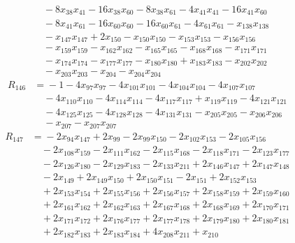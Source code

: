 \begin{align*}
&\quad{}-8x_{38}x_{41} -16x_{38}x_{60} -8x_{38}x_{61} -4x_{41}x_{41} -16x_{41}x_{60}\\
&\quad{}-8x_{41}x_{61} -16x_{60}x_{60} -16x_{60}x_{61} -4x_{61}x_{61} -x_{138}x_{138}\\
&\quad{}-x_{147}x_{147} +2x_{150} -x_{150}x_{150} -x_{153}x_{153} -x_{156}x_{156}\\
&\quad{}-x_{159}x_{159} -x_{162}x_{162} -x_{165}x_{165} -x_{168}x_{168} -x_{171}x_{171}\\
&\quad{}-x_{174}x_{174} -x_{177}x_{177} -x_{180}x_{180} +x_{183}x_{183} -x_{202}x_{202}\\
&\quad{}-x_{203}x_{203} -x_{204} -x_{204}x_{204}
\end{align*}
\begin{align*}
R_{146}&={}-1 -4x_{97}x_{97} -4x_{101}x_{101} -4x_{104}x_{104} -4x_{107}x_{107}\\
&\quad{}-4x_{110}x_{110} -4x_{114}x_{114} -4x_{117}x_{117} +x_{119}x_{119} -4x_{121}x_{121}\\
&\quad{}-4x_{125}x_{125} -4x_{128}x_{128} -4x_{131}x_{131} -x_{205}x_{205} -x_{206}x_{206}\\
&\quad{}-x_{207} -x_{207}x_{207}
\end{align*}
\begin{align*}
R_{147}&={}-2x_{94}x_{147} +2x_{99} -2x_{99}x_{150} -2x_{102}x_{153} -2x_{105}x_{156}\\
&\quad{}-2x_{108}x_{159} -2x_{111}x_{162} -2x_{115}x_{168} -2x_{118}x_{171} -2x_{123}x_{177}\\
&\quad{}-2x_{126}x_{180} -2x_{129}x_{183} -2x_{133}x_{211} +2x_{146}x_{147} +2x_{147}x_{148}\\
&\quad{}-2x_{149} +2x_{149}x_{150} +2x_{150}x_{151} -2x_{151} +2x_{152}x_{153}\\
&\quad{}+2x_{153}x_{154} +2x_{155}x_{156} +2x_{156}x_{157} +2x_{158}x_{159} +2x_{159}x_{160}\\
&\quad{}+2x_{161}x_{162} +2x_{162}x_{163} +2x_{167}x_{168} +2x_{168}x_{169} +2x_{170}x_{171}\\
&\quad{}+2x_{171}x_{172} +2x_{176}x_{177} +2x_{177}x_{178} +2x_{179}x_{180} +2x_{180}x_{181}\\
&\quad{}+2x_{182}x_{183} +2x_{183}x_{184} +4x_{208}x_{211} +x_{210}
\end{align*}
